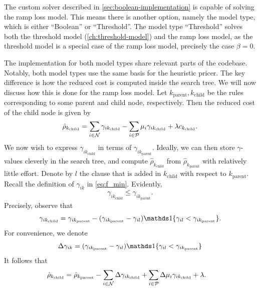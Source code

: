 The custom solver described in \autoref{sec:boolean-implementation} is capable of solving the ramp loss model.
This means there is another option, namely the model type, which is either ``Boolean'' or ``Threshold''.
The model type ``Threshold'' solves both the threshold model (\autoref{ch:threshold-model})
and the ramp loss model, as the threshold model is a special case of the ramp loss model,
precisely the case $\beta = 0.$

The implementation for both model types share relevant parts of the codebase.
Notably, both model types use the same basis for the heuristic pricer.
The key difference is how the reduced cost is computed inside the search tree.
We will now discuss how this is done for the ramp loss model.
Let $k_\text{parent}, k_\text{child}$ be the rules corresponding to some parent and child node, respectively.
Then the reduced cost of the child node is given by
\begin{equation}
        \hat \rho_{k_\text{child}} =  \sum_{i \in \mathcal{N}} \gamma_{ik_\text{child}}
    -\sum_{i \in \mathcal{P}}  \mu_i \gamma_{ik_\text{child}} +\lambda  c_{k_\text{child}}.  \label{eq:RP_redcost_node}
\end{equation}
We now wish to express $\gamma_{ik_\text{child}}$ in terms of $\gamma_{ik_\text{parent}}$.
Ideally, we can then store $\gamma$-values cleverly in the search tree, and compute
$\hat \rho_{k_\text{child}}$ from $\hat \rho_{k_\text{parent}}$ with relatively little effort.
Denote by $l$ the clause that is added in $k_\text{child}$ with respect to $k_\text{parent}.$
Recall the definition of $\gamma_{ik}$ in \eqref{eq:f_min}.
Evidently,
\[
  \gamma_{ik_\text{child}} \leq \gamma_{ik_\text{parent}}.
\]
Precisely, observe that
\begin{equation}\label{eq:RP_gamma_diff}
    \gamma_{ik_\text{child}} = \gamma_{ik_\text{parent}} - (\gamma_{ik_\text{parent}} - \gamma_{il})\Ind\{\gamma_{il} < \gamma_{ik_\text{parent}}\}.
\end{equation}
For convenience, we denote
\begin{equation}\label{eq:RP_delta_gamma}
    \Delta \gamma_{ik} = (\gamma_{ik_\text{parent}} - \gamma_{il})\Ind\{\gamma_{il} < \gamma_{ik_\text{parent}}\}
\end{equation}
It follows that
\begin{equation}
    \begin{split}
        \hat \rho_{k_\text{child}} = \; & \hat{\rho}_{k_\text{parent}} - \sum_{i \in \mathcal{N}} \Delta \gamma_{ik_\text{child}}
        + \sum_{i \in \mathcal{P}} \Delta \mu_i \gamma_{ik_\text{child}}
        + \lambda.
    \end{split}
    \label{eq:RP_redcost_node_deriv}
\end{equation}
